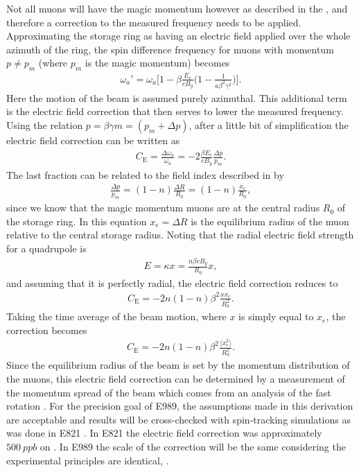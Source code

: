 Not all muons will have the magic momentum however as described in the , and therefore a correction to the measured \wa frequency needs to be applied. Approximating the storage ring as having an electric field applied over the whole azimuth of the ring, the spin difference frequency for muons with momentum $p \neq p_{m}$ (where $p_{m}$ is the magic momentum) becomes  
        \begin{align} \label{eq:waEfield}
            \omega_{a}' = \omega_{a} \Big[ 1 - \beta \frac{E_{r}}{c B_{y}} \Big( 1 - \frac{1}{a \beta^{2} \gamma^{2}} \Big) \Big].
        \end{align}
Here the motion of the beam is assumed purely azimuthal. This additional term is the electric field correction that then serves to lower the measured \wa frequency. Using the relation $p = \beta \gamma m = (p_{m} + \Delta p)$, after a little bit of simplification the electric field correction can be written as
        \begin{align}
            C_{\text{E}} = \frac{\Delta\omega_{a}}{\omega_{a}} = -2 \frac{\beta E_{r}}{c B_{y}} \frac{\Delta p}{p_{m}}.
        \end{align}
The last fraction can be related to the field index described in  by
        \begin{align}
            \frac{\Delta p}{p_{m}} = (1-n) \frac{\Delta R}{R_{0}} = (1-n) \frac{x_{e}}{R_{0}}, 
        \end{align}
since we know that the magic momentum muons are at the central radius $R_{0}$ of the storage ring. In this equation $x_{e} = \Delta R$ is the equilibrium radius of the muon relative to the central storage radius. Noting that the radial electric field strength for a quadrupole is 
        \begin{align}
            E = \kappa x = \frac{n \beta c B_{y}}{R_{0}} x,
        \end{align}
and assuming that it is perfectly radial, the electric field correction reduces to 
        \begin{align}
            C_{\text{E}} = -2n (1-n) \beta^{2} \frac{x x_{e}}{R_{0}^{2}}.
        \end{align}
Taking the time average of the beam motion, where $x$ is simply equal to $x_{e}$, the correction becomes
        \begin{align}
            C_{\text{E}} = -2n (1-n) \beta^{2} \frac{\langle x_{e}^{2} \rangle}{R_{0}^{2}}.
        \end{align}
Since the equilibrium radius of the beam is set by the momentum distribution of the muons, this electric field correction can be determined by a measurement of the momentum spread of the beam which comes from an analysis of the fast rotation \cite{fastrotation1,fastrotation2}. For the precision goal of E989, the assumptions made in this derivation are acceptable \cite{TDR} and results will be cross-checked with spin-tracking simulations as was done in E821 \cite{E821FinalReport}. In E821 the electric field correction was approximately $\SI{500}{ppb}$ on \wa \cite{E821FinalReport}. In E989 the scale of the correction will be the same considering the experimental principles are identical, .


